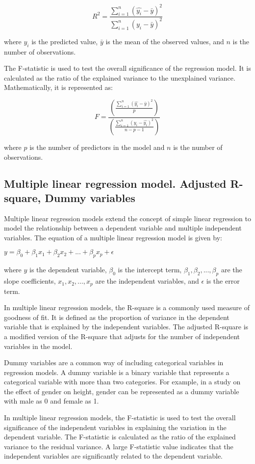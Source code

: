 \documentclass[12pt, a4paper, oneside]{article}
\begin{document}
$$R^2 = \frac{\sum_{i=1}^n (\hat{y_i} - \bar{y})^2}{\sum_{i=1}^n (y_i - \bar{y})^2}$$

where $\hat{y_i}$ is the predicted value, $\bar{y}$ is the mean of the observed values, and $n$ is the number of observations.

The F-statistic is used to test the overall significance of the regression model. It is calculated as the ratio of the explained variance to the unexplained variance. Mathematically, it is represented as:

$$F = \frac{\left(\frac{\sum_{i=1}^n (\hat{y_i} - \bar{y})^2}{p}\right)}{\left(\frac{\sum_{i=1}^n (y_i - \hat{y_i})^2}{n-p-1}\right)}$$

where $p$ is the number of predictors in the model and $n$ is the number of observations.
\subsection{ Multiple linear regression model. Adjusted R-square, Dummy variables }
Multiple linear regression models extend the concept of simple linear regression to model the relationship between a dependent variable and multiple independent variables. The equation of a multiple linear regression model is given by:

$y = \beta_0 + \beta_1 x_1 + \beta_2 x_2 + ... + \beta_p x_p + \epsilon$

where $y$ is the dependent variable, $\beta_0$ is the intercept term, $\beta_1, \beta_2, ..., \beta_p$ are the slope coefficients, $x_1, x_2, ..., x_p$ are the independent variables, and $\epsilon$ is the error term.

In multiple linear regression models, the R-square is a commonly used measure of goodness of fit. It is defined as the proportion of variance in the dependent variable that is explained by the independent variables. The adjusted R-square is a modified version of the R-square that adjusts for the number of independent variables in the model.

Dummy variables are a common way of including categorical variables in regression models. A dummy variable is a binary variable that represents a categorical variable with more than two categories. For example, in a study on the effect of gender on height, gender can be represented as a dummy variable with male as 0 and female as 1.

In multiple linear regression models, the F-statistic is used to test the overall significance of the independent variables in explaining the variation in the dependent variable. The F-statistic is calculated as the ratio of the explained variance to the residual variance. A large F-statistic value indicates that the independent variables are significantly related to the dependent variable.
\end{document}

